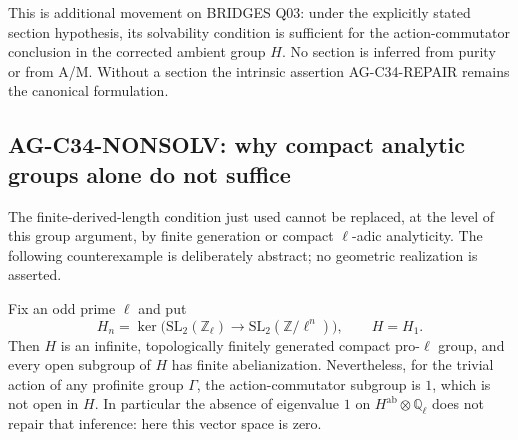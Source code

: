 This is additional movement on BRIDGES Q03: under the explicitly stated
section hypothesis, its solvability condition is sufficient for the
action-commutator conclusion in the corrected ambient group $H$.
No section is inferred from purity or from A/M. Without a section the
intrinsic assertion AG-C34-REPAIR remains the canonical formulation.

\subsection{AG-C34-NONSOLV: why compact analytic groups alone do not suffice}
\label{ag:c34nonsolv}

The finite-derived-length condition just used cannot be replaced, at
the level of this group argument, by finite generation or compact
$\ell$-adic analyticity. The following counterexample is deliberately
abstract; no geometric realization is asserted.

Fix an odd prime $\ell$ and put
\[
 H_n=\ker\bigl(\mathrm{SL}_2(\mathbb Z_\ell)
            \longrightarrow\mathrm{SL}_2(\mathbb Z/\ell^n)\bigr),
 \qquad H=H_1.
\]
Then $H$ is an infinite, topologically finitely generated compact
pro-$\ell$ group, and every open subgroup of $H$ has finite
abelianization. Nevertheless, for the trivial action of any profinite
group $\Gamma$, the action-commutator subgroup is $1$, which is not
open in $H$. In particular the absence of eigenvalue $1$ on
$H^{\mathrm{ab}}\otimes\mathbb Q_\ell$ does not repair that
inference: here this vector space is zero.

